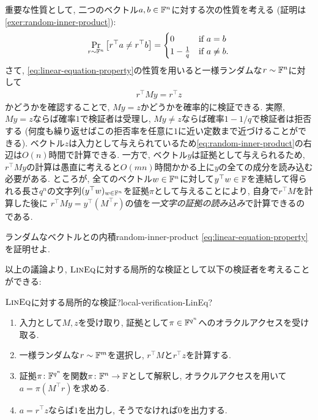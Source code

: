重要な性質として, 二つのベクトル$a,b\in\mathbb{F}^n$に対する次の性質を考える (証明は\cref{exer:random-inner-product}):
\begin{align}
  \Pr_{r\sim \mathbb{F}^n} \qty[ r^\top a \ne r^\top b ] = \begin{cases}
    0 & \text{if } a=b \\
    1-\frac{1}{q} & \text{if } a\ne b.
  \end{cases} \label{eq:linear-equation-property}
\end{align}
さて, \cref{eq:linear-equation-property}の性質を用いると一様ランダムな$r\sim\mathbb{F}^n$に対して
\begin{align}
  r^\top M y = r^\top z \label{eq:random-inner-product}
\end{align}
かどうかを確認することで, $My=z$かどうかを確率的に検証できる.
実際, $My=z$ならば確率$1$で検証者は受理し,
$My\ne z$ならば確率$1-1/q$で検証者は拒否する (何度も繰り返せばこの拒否率を任意に$1$に近い定数まで近づけることができる).
ベクトル$z$は入力として与えられているため\cref{eq:random-inner-product}の右辺は$O(n)$時間で計算できる.
一方で, ベクトル$y$は証拠として与えられるため, $r^\top M y$の計算は愚直に考えると$O(mn)$時間かかる上に$y$の全ての成分を読み込む必要がある.
ところが, 全てのベクトル$w\in \mathbb{F}^n$に対して$y^\top w\in\mathbb{F}$を連結して得られる長さ$q^n$の文字列$(y^\top w)_{w\in \mathbb{F}^n}$を証拠$\pi$として与えることにより,
自身で$r^\top M$を計算した後に $r^\top M y = y^\top (M^\top r)$の値を\emph{一文字の証拠の読み込み}で計算できるのである.

\begin{exercise}{ランダムなベクトルとの内積}{random-inner-product}
  \cref{eq:linear-equation-property}を証明せよ.
\end{exercise}

以上の議論より, $\textsc{LinEq}$に対する局所的な検証として以下の検証者を考えることができる:
\begin{algorithm}{$\textsc{LinEq}$に対する局所的な検証?}{local-verification-LinEq?}
  \begin{enumerate}
  \item 入力として$M,z$を受け取り, 証拠として$\pi \in \mathbb{F}^{q^n}$へのオラクルアクセスを受け取る.
  \item 一様ランダムな$r\sim\mathbb{F}^m$を選択し, $r^\top M$と$r^\top z$を計算する.
  \item 証拠$\pi\colon \mathbb{F}^{q^n}$を関数$\pi\colon \mathbb{F}^n\to \mathbb{F}$として解釈し, オラクルアクセスを用いて$a=\pi(M^\top r)$を求める.
  \item $a=r^\top z$ならば$1$を出力し, そうでなければ$0$を出力する.
  \end{enumerate}
\end{algorithm}

